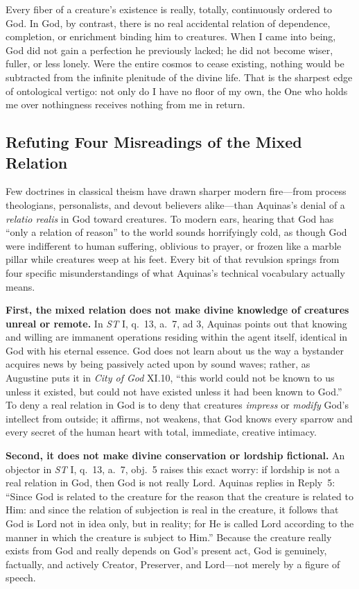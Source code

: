 Every fiber of a creature's existence is really, totally, continuously ordered to God. In God, by contrast, there is no real accidental relation of dependence, completion, or enrichment binding him to creatures. When I came into being, God did not gain a perfection he previously lacked; he did not become wiser, fuller, or less lonely. Were the entire cosmos to cease existing, nothing would be subtracted from the infinite plenitude of the divine life. That is the sharpest edge of ontological vertigo: not only do I have no floor of my own, the One who holds me over nothingness receives nothing from me in return.

\subsection{Refuting Four Misreadings of the Mixed Relation}

Few doctrines in classical theism have drawn sharper modern fire---from process theologians, personalists, and devout believers alike---than Aquinas's denial of a \emph{relatio realis} in God toward creatures. To modern ears, hearing that God has ``only a relation of reason'' to the world sounds horrifyingly cold, as though God were indifferent to human suffering, oblivious to prayer, or frozen like a marble pillar while creatures weep at his feet. Every bit of that revulsion springs from four specific misunderstandings of what Aquinas's technical vocabulary actually means.

\textbf{First, the mixed relation does not make divine knowledge of creatures unreal or remote.} In \emph{ST} I, q.\ 13, a.\ 7, ad 3, Aquinas points out that knowing and willing are immanent operations residing within the agent itself, identical in God with his eternal essence. God does not learn about us the way a bystander acquires news by being passively acted upon by sound waves; rather, as Augustine puts it in \emph{City of God} XI.10, ``this world could not be known to us unless it existed, but could not have existed unless it had been known to God.'' To deny a real relation in God is to deny that creatures \emph{impress} or \emph{modify} God's intellect from outside; it affirms, not weakens, that God knows every sparrow and every secret of the human heart with total, immediate, creative intimacy.

\textbf{Second, it does not make divine conservation or lordship fictional.} An objector in \emph{ST} I, q.\ 13, a.\ 7, obj.\ 5 raises this exact worry: if lordship is not a real relation in God, then God is not really Lord. Aquinas replies in Reply~5: ``Since God is related to the creature for the reason that the creature is related to Him: and since the relation of subjection is real in the creature, it follows that God is Lord not in idea only, but in reality; for He is called Lord according to the manner in which the creature is subject to Him.'' Because the creature really exists from God and really depends on God's present act, God is genuinely, factually, and actively Creator, Preserver, and Lord---not merely by a figure of speech.

